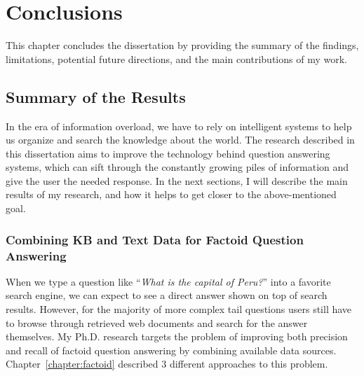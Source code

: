 \chapter{Conclusions}
\label{chapter:conclusion}

This chapter concludes the dissertation by providing the summary of the findings, limitations, potential future directions, and the main contributions of my work.

\section{Summary of the Results}
\label{section:conclusion:summary}

In the era of information overload, we have to rely on intelligent systems to help us organize and search the knowledge about the world.
The research described in this dissertation aims to improve the technology behind question answering systems, which can sift through the constantly growing piles of information and give the user the needed response.
In the next sections, I will describe the main results of my research, and how it helps to get closer to the above-mentioned goal.

\subsection{Combining KB and Text Data for Factoid Question Answering}
\label{section:conclusion:summary:factoid}

When we type a question like ``\textit{What is the capital of Peru?}'' into a favorite search engine, we can expect to see a direct answer shown on top of search results.
However, for the majority of more complex tail questions users still have to browse through retrieved web documents and search for the answer themselves.
My Ph.D. research targets the problem of improving both precision and recall of factoid question answering by combining available data sources.
Chapter~\ref{chapter:factoid} described 3 different approaches to this problem.

